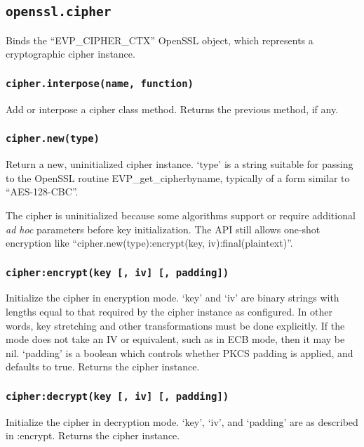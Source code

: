 \documentclass[11pt, oneside]{memoir}
\newcommand*{\fn}[1]{\texttt{#1}\xspace}
\newcounter{toccols}
\newenvironment{Module}[1]{
	\subsection{\texttt{#1}}
	\addtocontents{toc}{
		\protect\begin{multicols}{\value{toccols}}
	}
}{
	\addtocontents{toc}{\protect\end{multicols}}
}
\begin{document}
\begin{Module}{openssl.cipher}

Binds the ``EVP\_CIPHER\_CTX'' OpenSSL object, which represents a cryptographic cipher instance.

\subsubsection[\fn{cipher.interpose}]{\fn{cipher.interpose(name, function)}}

Add or interpose a cipher class method. Returns the previous method, if any.

\subsubsection[\fn{cipher.new}]{\fn{cipher.new(type)}}

Return a new, uninitialized cipher instance. `type' is a string suitable for passing to the OpenSSL routine EVP\_get\_cipherbyname, typically of a form similar to ``AES-128-CBC''.

The cipher is uninitialized because some algorithms support or require additional \textit{ad hoc} parameters before key initialization. The API still allows one-shot encryption like ``cipher.new(type):encrypt(key, iv):final(plaintext)''.

\subsubsection[\fn{cipher:encrypt}]{\fn{cipher:encrypt(key [, iv] [, padding])}}

Initialize the cipher in encryption mode. `key' and `iv' are binary strings with lengths equal to that required by the cipher instance as configured. In other words, key stretching and other transformations must be done explicitly. If the mode does not take an IV or equivalent, such as in ECB mode, then it may be nil. `padding' is a boolean which controls whether PKCS padding is applied, and defaults to true. Returns the cipher instance.

\subsubsection[\fn{cipher:decrypt}]{\fn{cipher:decrypt(key [, iv] [, padding])}}

Initialize the cipher in decryption mode. `key', `iv', and `padding' are as described in :encrypt. Returns the cipher instance.


\end{Module}
\end{document}
